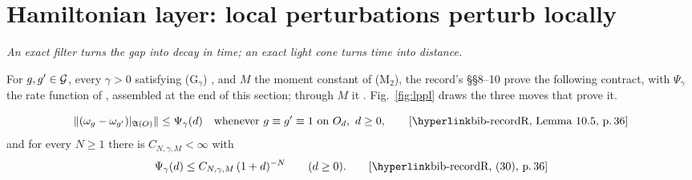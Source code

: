 \section{Hamiltonian layer: local perturbations perturb locally}\label{sec:lppl}

\emph{An exact filter turns the gap into decay in time; an exact light cone turns time
into distance.}\par\nopagebreak

For $g,g'\in\mathcal{G}$, every $\gamma>0$ satisfying (G$_\gamma$) , and $M$ the
moment constant of (M$_2$), the record's \S\S8--10 prove the following contract, with
$\Psi_\gamma$ the rate function of , assembled at the end of this section;
through $M$ it . Fig.~\ref{fig:lppl} draws the three moves that
prove it.
\begin{checkpoint}
\vspace{-1ex}
\begin{equation*}
 \|(\omega_g-\omega_{g'})|_{\A(O)}\|\le\Psi_\gamma(d)\quad\text{whenever }
 g\equiv g'\equiv1\text{ on }O_d,\ d\ge0 ,
 \tag*{\rec{Lemma~10.5}{36}}
\end{equation*}
and for every $N\ge1$ there is $C_{N,\gamma,M}<\infty$ with
\begin{equation*}
 \Psi_\gamma(d)\le C_{N,\gamma,M}\,(1+d)^{-N}\qquad(d\ge0) .
 \tag*{\rec{(30)}{36}}
\end{equation*}
\end{checkpoint}


